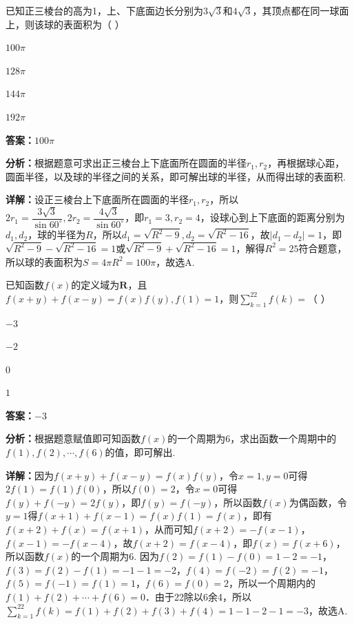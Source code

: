 \begin{question}[points=5]
已知正三棱台的高为1，上、下底面边长分别为$3\sqrt{3}$和$4\sqrt{3}$，其顶点都在同一球面上，则该球的表面积为（ ）
\begin{choices}
  \item $100\pi$
  \item $128\pi$
  \item $144\pi$
  \item $192\pi$
\end{choices}
\begin{solution}
\textbf{答案：}$100\pi$

\textbf{分析：}根据题意可求出正三棱台上下底面所在圆面的半径$r_1,r_2$，再根据球心距，圆面半径，以及球的半径之间的关系，即可解出球的半径，从而得出球的表面积.

\textbf{详解：}设正三棱台上下底面所在圆面的半径$r_1,r_2$，所以$2r_1=\dfrac{3\sqrt{3}}{\sin60^\circ},2r_2=\dfrac{4\sqrt{3}}{\sin60^\circ}$，即$r_1=3,r_2=4$，设球心到上下底面的距离分别为$d_1,d_2$，球的半径为$R$，所以$d_1=\sqrt{R^2-9},d_2=\sqrt{R^2-16}$，故$|d_1-d_2|=1$，即$\sqrt{R^2-9}-\sqrt{R^2-16}=1$或$\sqrt{R^2-9}+\sqrt{R^2-16}=1$，解得$R^2=25$符合题意，所以球的表面积为$S=4\pi R^2=100\pi$，故选A.
\end{solution}
\end{question}

\begin{question}[points=5]
已知函数$f(x)$的定义域为$\mathbf{R}$，且$f(x+y)+f(x-y)=f(x)f(y),f(1)=1$，则$\displaystyle\sum_{k=1}^{22}f(k)=$（ ）
\begin{choices}
  \item $-3$
  \item $-2$
  \item $0$
  \item $1$
\end{choices}
\begin{solution}
\textbf{答案：}$-3$

\textbf{分析：}根据题意赋值即可知函数$f(x)$的一个周期为6，求出函数一个周期中的$f(1),f(2),\cdots,f(6)$的值，即可解出.

\textbf{详解：}因为$f(x+y)+f(x-y)=f(x)f(y)$，令$x=1,y=0$可得$2f(1)=f(1)f(0)$，所以$f(0)=2$，令$x=0$可得$f(y)+f(-y)=2f(y)$，即$f(y)=f(-y)$，所以函数$f(x)$为偶函数，令$y=1$得$f(x+1)+f(x-1)=f(x)f(1)=f(x)$，即有$f(x+2)+f(x)=f(x+1)$，从而可知$f(x+2)=-f(x-1)$，$f(x-1)=-f(x-4)$，故$f(x+2)=f(x-4)$，即$f(x)=f(x+6)$，所以函数$f(x)$的一个周期为6. 因为$f(2)=f(1)-f(0)=1-2=-1$，$f(3)=f(2)-f(1)=-1-1=-2$，$f(4)=f(-2)=f(2)=-1$，$f(5)=f(-1)=f(1)=1$，$f(6)=f(0)=2$，所以一个周期内的$f(1)+f(2)+\cdots+f(6)=0$．由于22除以6余4，所以$\sum_{k=1}^{22}f(k)=f(1)+f(2)+f(3)+f(4)=1-1-2-1=-3$，故选A.
\end{solution}
\end{question}

